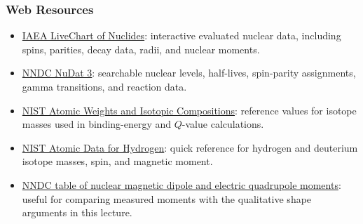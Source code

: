 \subsubsection*{Web Resources}
\begin{itemize}
  \item \href{https://www.iaea.org/resources/databases/livechart-of-nuclides-advanced-version}{IAEA LiveChart of Nuclides}: interactive evaluated nuclear data, including spins, parities, decay data, radii, and nuclear moments.
  \item \href{https://www.nndc.bnl.gov/nudat3/guide/}{NNDC NuDat 3}: searchable nuclear levels, half-lives, spin-parity assignments, gamma transitions, and reaction data.
  \item \href{https://www.nist.gov/pml/atomic-weights-and-isotopic-compositions-relative-atomic-masses}{NIST Atomic Weights and Isotopic Compositions}: reference values for isotope masses used in binding-energy and $Q$-value calculations.
  \item \href{https://www.physics.nist.gov/PhysRefData/Handbook/Tables/hydrogentable1.htm}{NIST Atomic Data for Hydrogen}: quick reference for hydrogen and deuterium isotope masses, spin, and magnetic moment.
  \item \href{https://www.nndc.bnl.gov/nndc/stone_moments/moments.html}{NNDC table of nuclear magnetic dipole and electric quadrupole moments}: useful for comparing measured moments with the qualitative shape arguments in this lecture.
\end{itemize}
